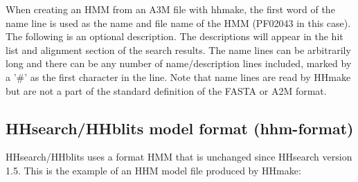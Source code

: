 \documentclass[11pt,a4paper]{article}
\begin{document}
When creating an HMM from an A3M file with hhmake, the first word of the name line is 
used as the name and file name of the HMM (PF02043 in this case). The following is an 
optional description. The descriptions will appear in the hit list and alignment section 
of the search results. The name lines can be arbitrarily long and there can be any number of 
name/description lines included, marked by a '\#' as the first character in the line. 
Note that name lines are read by HHmake but are not a part of the standard definition
of the FASTA or A2M format.
 

\subsection{HHsearch/HHblits model format (hhm-format)} \label{hhmformat}

HHsearch/HHblits uses a format HMM that is unchanged since HHsearch version 1.5. 
This is the example of an HHM model file produced by HHmake:
\end{document}
